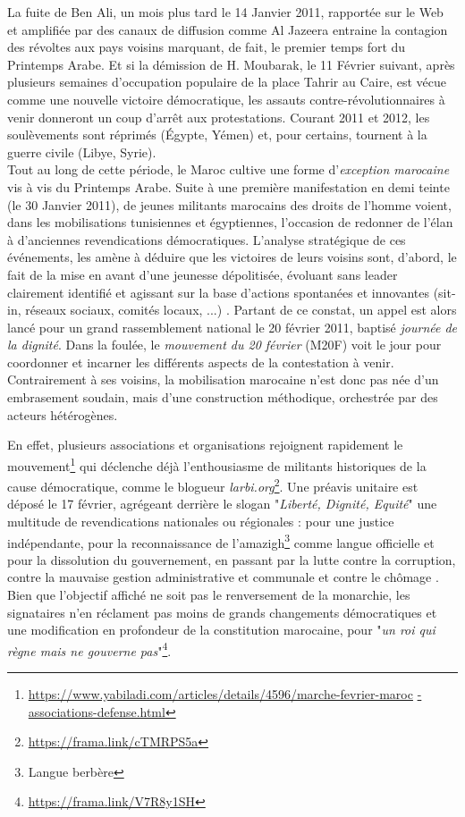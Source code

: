 \documentclass[symmetric,justified,marginals=raggedouter]{tufte-book}
\begin{document}
La fuite de Ben Ali, un mois plus tard le 14 Janvier 2011, rapportée sur le Web et amplifiée par des canaux de diffusion comme Al Jazeera entraine la contagion des révoltes aux pays voisins marquant, de fait, le premier temps fort du Printemps Arabe. Et si la démission de H. Moubarak, le 11 Février suivant, après plusieurs semaines d'occupation populaire de la place Tahrir au Caire, est vécue comme une nouvelle victoire démocratique, les assauts contre-révolutionnaires à venir donneront un coup d'arrêt aux protestations. Courant 2011 et 2012, les soulèvements sont réprimés (Égypte, Yémen) et, pour certains, tournent à la guerre civile (Libye, Syrie). \\

\noindent Tout au long de cette période, le Maroc cultive une forme d'\textit{exception marocaine} vis à vis du Printemps Arabe. Suite à une première manifestation en demi teinte (le 30 Janvier 2011), de jeunes militants marocains des droits de l'homme voient, dans les mobilisations tunisiennes et égyptiennes, l'occasion de redonner de l'élan à d'anciennes revendications démocratiques. L'analyse stratégique de ces événements, les amène à déduire que les victoires de leurs voisins sont, d'abord, le fait de la mise en avant d'une jeunesse dépolitisée, évoluant sans leader clairement identifié et agissant sur la base d'actions spontanées et innovantes (sit-in, réseaux sociaux, comités locaux, ...) \citep{bennani-chraibi_dynamique_2012}. Partant de ce constat, un appel est alors lancé pour un grand rassemblement national le 20 février 2011, baptisé \textit{journée de la dignité}. Dans la foulée, le \textit{mouvement du 20 février} (M20F) voit le jour pour coordonner et incarner les différents aspects de la contestation à venir. Contrairement à ses voisins, la mobilisation marocaine n'est donc pas née d'un embrasement soudain, mais d'une construction méthodique, orchestrée par des acteurs hétérogènes.

En effet, plusieurs associations et organisations rejoignent rapidement le mouvement\footnote{\url{https://www.yabiladi.com/articles/details/4596/marche-fevrier-maroc} \url{-associations-defense.html}} qui déclenche déjà l'enthousiasme de militants historiques de la cause démocratique, comme le blogueur \textit{larbi.org}\footnote{\url{https://frama.link/cTMRPS5a}}. Une préavis unitaire est déposé le 17 février, agrégeant derrière le slogan "\textit{Liberté, Dignité, Equité}" une multitude de revendications nationales ou régionales : pour une justice indépendante, pour la reconnaissance de l'amazigh\footnote{Langue berbère } comme langue officielle et pour la dissolution du gouvernement, en passant par la lutte contre la corruption, contre la mauvaise gestion administrative et communale et contre le chômage \citep{bennafla_maroc_2011}. Bien que l'objectif affiché ne soit pas le renversement de la monarchie, les signataires n'en réclament pas moins de grands changements démocratiques et une modification en profondeur de la constitution marocaine, pour "\textit{un roi qui règne mais ne gouverne pas}"\footnote{\url{https://frama.link/V7R8y1SH}}.
\end{document}

